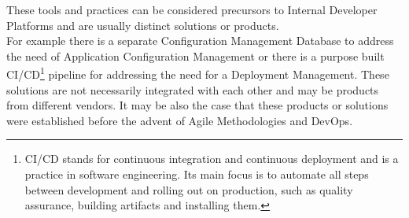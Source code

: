 \documentclass[a4paper,10pt]{article}
\begin{document}
    These tools and practices can be considered precursors to Internal Developer Platforms and are usually
    distinct solutions or products.\\
    For example there is a separate Configuration Management Database to address the need of Application Configuration
    Management or there is a purpose built CI/CD\footnote{CI/CD stands for continuous
    integration and continuous deployment and is a practice in software engineering. Its main focus is to automate all steps
    between development and rolling out on production, such as quality assurance, building artifacts and installing them.}
    pipeline for addressing the need for a Deployment Management.
    These solutions are not necessarily integrated with each other and may be products from different vendors.
    It may be also the case that these products or solutions were established before the advent of Agile Methodologies and DevOps.
\end{document}
